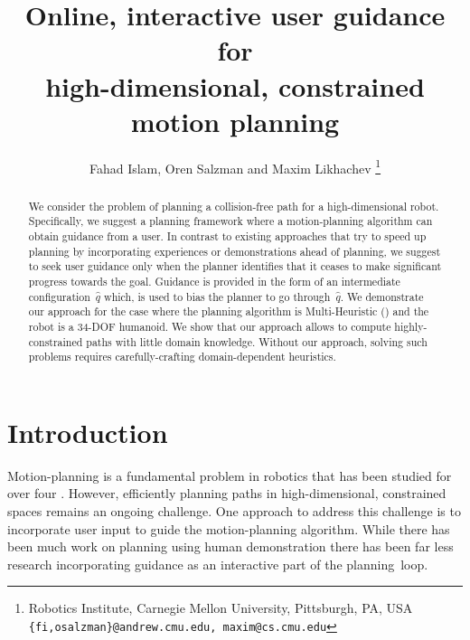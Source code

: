 \documentclass{article}
\title{	Online, interactive user guidance for \\
		high-dimensional, constrained motion planning }
\author{Fahad Islam, Oren Salzman and Maxim Likhachev%
  \thanks{Robotics Institute, Carnegie Mellon University, Pittsburgh, PA, USA
    {\tt\small \{fi,osalzman\}@andrew.cmu.edu, maxim@cs.cmu.edu}
  }%
}
\begin{document}
\maketitle
\thispagestyle{empty}
\pagestyle{empty}


\begin{abstract}
We consider the problem of planning a collision-free path for a high-dimensional robot.
Specifically, we suggest a planning framework where a motion-planning algorithm can obtain guidance from a user.
In contrast to existing approaches that try to speed up planning by incorporating experiences or demonstrations ahead of planning, 
we suggest to seek user guidance only when the planner identifies that it ceases to make significant progress towards the goal.
Guidance is provided in the form of an intermediate configuration~$\hat{q}$ which, is used to bias the planner to go through~$\hat{q}$.
We demonstrate our approach for the case where the planning algorithm is Multi-Heuristic \astar (\mhastar) and the robot is a 34-DOF humanoid.
We show that our approach allows to compute highly-constrained paths with little domain knowledge.
Without our approach, solving such problems requires carefully-crafting domain-dependent heuristics. 
\end{abstract}



\section{Introduction}
\label{sec:intro}

Motion-planning is a fundamental problem in robotics that has been studied for over four .
However, efficiently planning paths in high-dimensional, constrained spaces remains an ongoing challenge.
One approach to address this challenge is to incorporate user input to guide the motion-planning algorithm.
While there has been much work on planning using human demonstration 
there has been far less research incorporating guidance as an interactive part of the planning~loop.
\end{document}
